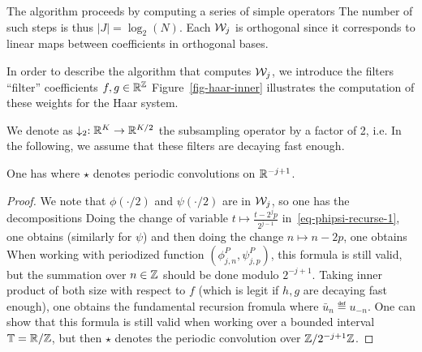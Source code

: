 The algorithm proceeds by computing a series of simple operators 
The number of such steps is thus $|J|=\log_2(N)$. Each $\mathcal{W}_j$ is orthogonal since it corresponds to linear maps between coefficients in orthogonal bases. 

In order to describe the algorithm that computes $\mathcal{W}_j$, we introduce the filters ``filter'' coefficients $f, g \in \mathbb{R}^{\mathbb{Z}}$
Figure~\ref{fig-haar-inner} illustrates the computation of these weights for the Haar system.



We denote as $\downarrow_2 : \mathbb{R}^K \rightarrow \mathbb{R}^{K/2}$ the subsampling operator by a factor of 2, i.e.
In the following, we assume that these filters are decaying fast enough.

\begin{prop}
One has
where $\star$ denotes periodic convolutions on $\mathbb{R}^{-j+1}$. 
\end{prop}

\begin{proof}
We note that $\phi(\cdot/2)$ and $\psi(\cdot/2)$ are in $\mathcal{W}_j$, so one has the decompositions
Doing the change of variable $t \mapsto \frac{t-2^j p}{2^{j-1}}$ in~\eqref{eq-phipsi-recurse-1}, one obtains
(similarly for $\psi$) and then doing the change $n \mapsto n-2p$, one obtains
When working with periodized function $(\phi_{j,n}^P,\psi_{j,p}^P)$, this formula is still valid, but the summation over $n \in \mathbb{Z}$ should be done modulo $2^{-j+1}$. 
%
Taking inner product of both size with respect to $f$ (which is legit if $h,g$ are decaying fast enough), one obtains the fundamental recursion fromula
where $\bar u_n \eqdef u_{-n}$. 
%
One can show that this formula is still valid when working over a bounded interval $\mathbb{T}=\mathbb{R}/\mathbb{Z}$, but then $\star$ denotes the periodic convolution over $\mathbb{Z}/2^{-j+1}\mathbb{Z}$.
\end{proof}

